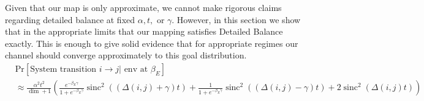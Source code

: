 \documentclass{article}
\newcommand{\parens}[1]{\left( #1 \right)}
\newcommand{\prob}[1]{\text{Pr}\left[ #1 \right]}
\DeclareMathOperator{\sinc}{sinc}
\begin{document}
Given that our map is only approximate, we cannot make rigorous claims regarding detailed balance at fixed $\alpha, t,$ or $\gamma$. However, in this section we show that in the appropriate limits that our mapping satisfies Detailed Balance exactly. This is enough to give solid evidence that for appropriate regimes our channel should converge approximately to this goal distribution.
\begin{align}
    &\prob{\text{System transition } i \to j | \text{ env at } \beta_E} \nonumber \\
    &\approx \frac{\alpha^2 t^2}{\dim + 1} \parens {\frac{e^{-\beta_E \gamma}}{1 + e^{-\beta_E \gamma}}  \sinc^2((\Delta(i,j) + \gamma)t) + \frac{1}{1 + e^{-\beta_E \gamma}} \sinc^2 ((\Delta(i,j) - \gamma)t) + 2 \sinc^2(\Delta(i,j) t)} \nonumber
\end{align}
\end{document}
